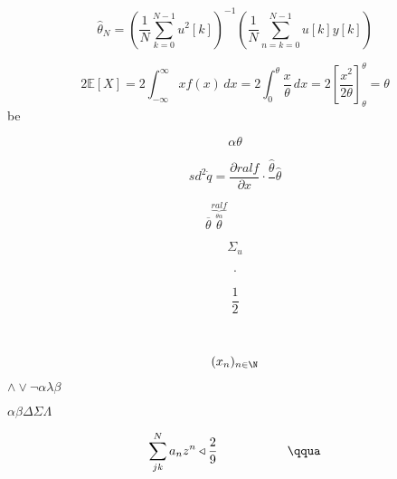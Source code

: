 \begin{equation}
  \hat{\theta}_N=\left( \frac{1}{N} \sum_{k=0}^{N-1} u^{2}[k] \right) ^{-1} (\frac{1}{N} \sum_{n=k=0}^{N-1} u[k]y[k])
\end{equation} 

\begin{equation}
  2 \mathbb{E}[X]=2 \int_{-\infty}^{\infty} xf(x) \, dx=2 \int_{0}^{\theta} \frac{x}{\theta} \, dx = 2 \left[ \frac{x^2}{2\theta} \right]^{\theta}_\theta=\theta
\end{equation} 
 be

 \begin{equation}
 \alpha \theta 
 \end{equation} 

\begin{equation}
sd^{2}
\dot{q}= \frac{\partial ralf}{\partial x} \cdot \frac{\hat{\theta}}{} \hat{\theta}
\end{equation} 

\begin{equation}
\overline{\theta}
\overset{\underbrace{ralf}_{\theta\overset{}{\alpha}}}{\theta} \quad \qquad
\end{equation}

\begin{equation}
\Sigma_u
\end{equation} 

\begin{align*}
  
.\end{align*}

\begin{equation}
  \frac{1}{2}
\end{equation}

\begin{equation}
  \frac{}{}
\end{equation}

\begin{equation}
(x_n)_{n\in\N}
\end{equation} 

$\land \lor \neg \alpha\lambda\beta$

$\alpha \beta \Delta \Sigma \Lambda$

\begin{equation}
\sum_{jk}^{N} a_n z^n \triangleleft \frac{2}{9} \enspace \quad \qquad \qquad \qqua
\end{equation} 
